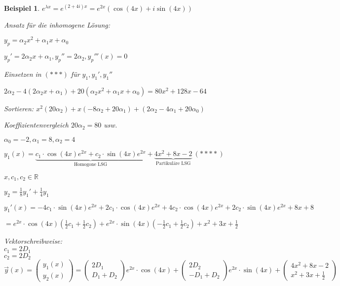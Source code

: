 \documentclass[fontset=ubuntu,11pt,a4paper,fleqn,headsepline]{scrreprt}
\newtheorem{beispiel}[defi]{Beispiel}
\begin{document}
\begin{multicols}{2}
\begin{beispiel}
            \(e^{\lambda x}=e^{(2+4i)x}=e^{2x}(\cos(4x)+i\sin(4x)) \)
    
            Ansatz für die inhomogene Lösung:
    
            \(y_p=\alpha_2x^2+\alpha_1x+\alpha_0 \)
    
            \(y_p'=2\alpha_2x+\alpha_1, y_p''=2\alpha_2, y_p'''(x)=0 \)
    
            Einsetzen in \((***)\) für \(y_1, y_1', y_1''\)
            
            \(2\alpha_2-4(2\alpha_2x+\alpha_1)+20(\alpha_2x^2+\alpha_1x+\alpha_0) = 80x^2+128x-64\)
    
            Sortieren: \(x^2(20\alpha_2)+x(-8\alpha_2+20\alpha_1)+(2\alpha_2-4\alpha_1+20\alpha_0)\)
    
            Koeffizientenvergleich \(20\alpha_2 = 80 \) usw.
    
            \(\alpha_0=-2, \alpha_1=8, \alpha_2=4  \)
            
            \( y_1(x)=\underbrace{c_1\cdot\cos(4x)e^{2x}+c_2\cdot\sin(4x)e^{2x}}_{\text{Homogone LSG}}+\underbrace{4x^2+8x-2}_{\text{Partikuläre LSG}}\ (****) \)
            
            \(x,c_1,c_2\in\mathbb{R}\)
    
            \(y_2=\frac{1}{8}y_1'+\frac{1}{4}y_1\)
    
            \(y_1'(x)=-4c_1\cdot\sin(4x)e^{2x}+2c_1\cdot\cos(4x)e^{2x}+4c_2\cdot\cos(4x)e^{2x}+2c_2\cdot\sin(4x)e^{2x}+8x+8 \)
    
            \(=e^{2x}\cdot\cos(4x)(\frac{1}{2}c_1+\frac{1}{2}c_2)+e^{2x}\cdot\sin(4x)(-\frac{1}{2}c_1+\frac{1}{2}c_2)+x^2+3x+\frac{1}{2} \)
    
            Vektorschreibweise: \\
            \(c_1=2D_1\) \\
            \(c_2=2D_2\) \\
            \( \vec{y}(x)=\begin{pmatrix}y_1(x) \\ y_2(x)\end{pmatrix} = \begin{pmatrix}2D_1 \\ D_1+D_2\end{pmatrix} e^{2x}\cdot\cos(4x)+\begin{pmatrix}2D_2 \\ -D_1+D_2\end{pmatrix}e^{2x}\cdot\sin(4x) + \begin{pmatrix}4x^2+8x-2 \\ x^2+3x +\frac{1}{2} \end{pmatrix} \)
            

\end{beispiel}
\end{multicols}
\end{document}
